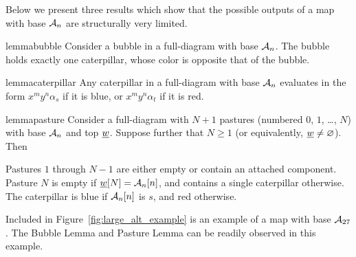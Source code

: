 Below we present three results which show that the possible outputs of a map with base $\AA_n$ are structurally very limited.
\begin{restatable}{lemma}{bubble}
	Consider a bubble in a full-diagram with base $\AA_n$.  The bubble holds exactly one caterpillar, whose color is opposite that of the bubble.
	\label{thm:bubble}
\end{restatable}
\begin{restatable}{lemma}{caterpillar}
	Any caterpillar in a full-diagram with base $\AA_n$ evaluates in the form $x^my^n\alpha_s$ if it is blue, or $x^my^n\alpha_t$ if it is red.
	\label{thm:caterpillar}
\end{restatable}
\begin{restatable}{lemma}{pasture}
	Consider a full-diagram with $N+1$ pastures (numbered $0$, $1$, \dots, $N$) with base $\AA_n$ and top $\ul w$.  Suppose further that $N \ge 1$ (or equivalently, $\ul w \neq \varnothing$).  Then
	\begin{enumerate}[(i)]
		\ii Pastures $1$ through $N-1$ are either empty or contain an attached component.
		\ii Pasture $N$ is empty if $\ul w[N] = \AA_n[n]$, and contains a single caterpillar otherwise.  The caterpillar is blue if $\AA_n[n]$ is $s$, and red otherwise.
	\end{enumerate}
	\label{thm:pasture}
\end{restatable}

Included in Figure~\ref{fig:large_alt_example} is an example of a map with base $\AA_{27}$.   The Bubble Lemma and Pasture Lemma can be readily observed in this example.

